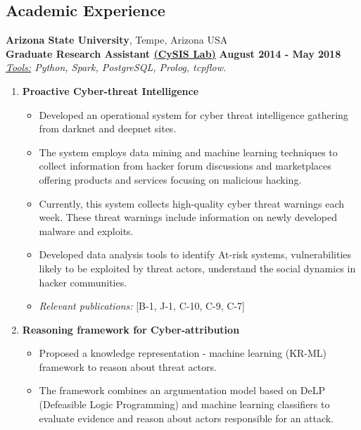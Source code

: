\documentclass[margin,line]{CV}
\begin{document}
\begin{resume}
\section{\sc Academic Experience}
{\bf Arizona State University}, Tempe, Arizona USA\\
{\bf Graduate Research Assistant \href{http://cysis.engineering.asu.edu/}{(CySIS Lab)}} \hfill {\bf August 2014 - May 2018}\\
\textit{\underline{Tools:} Python, Spark, PostgreSQL, Prolog, tcpflow.}\\
\begin{enumerate}
	\item {\bf{Proactive Cyber-threat Intelligence}} 
	\begin{itemize}
		\item Developed an operational system for cyber threat intelligence gathering from darknet and deepnet sites. 
		
		\item The system employs data mining and machine learning techniques to collect information from hacker forum discussions and marketplaces offering products and services focusing on malicious hacking. 
		
		\item Currently, this system collects high-quality cyber threat warnings each week. These threat warnings include information on newly developed malware and exploits. 
		
		\item Developed data analysis tools to identify At-risk systems, vulnerabilities likely to be exploited by threat actors, understand the social dynamics in hacker communities. 
		
		\item {\em Relevant publications:} [B-1, J-1, C-10, C-9, C-7]
	\end{itemize}
	
	
	\item {\bf{Reasoning framework for Cyber-attribution}} 
	\begin{itemize}
		\item Proposed a knowledge representation - machine learning (KR-ML) framework to reason about threat actors. 
		
		\item The framework combines an argumentation model based on DeLP (Defeasible Logic Programming) and machine learning classifiers to evaluate evidence and reason about actors responsible for an attack.
		

\end{itemize}
\end{enumerate}
\end{resume}
\end{document}
